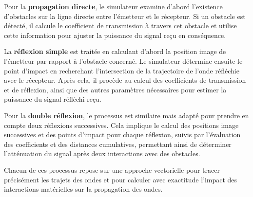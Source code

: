 Pour la \textbf{propagation directe}, le simulateur examine d'abord l'existence d'obstacles sur la ligne directe entre l'émetteur et le récepteur. Si un obstacle est détecté, il calcule le coefficient de transmission à travers cet obstacle et utilise cette information pour ajuster la puissance du signal reçu en conséquence.

La \textbf{réflexion simple} est traitée en calculant d'abord la position image de l'émetteur par rapport à l'obstacle concerné. Le simulateur détermine ensuite le point d'impact en recherchant l'intersection de la trajectoire de l'onde réfléchie avec le récepteur. Après cela, il procède au calcul des coefficients de transmission et de réflexion, ainsi que des autres paramètres nécessaires pour estimer la puissance du signal réfléchi reçu.

Pour la \textbf{double réflexion}, le processus est similaire mais adapté pour prendre en compte deux réflexions successives. Cela implique le calcul des positions image successives et des points d'impact pour chaque réflexion, suivis par l'évaluation des coefficients et des distances cumulatives, permettant ainsi de déterminer l'atténuation du signal après deux interactions avec des obstacles.

Chacun de ces processus repose sur une approche vectorielle  pour tracer précisément les trajets des ondes et pour calculer avec exactitude l'impact des interactions matérielles sur la propagation des ondes.
 


